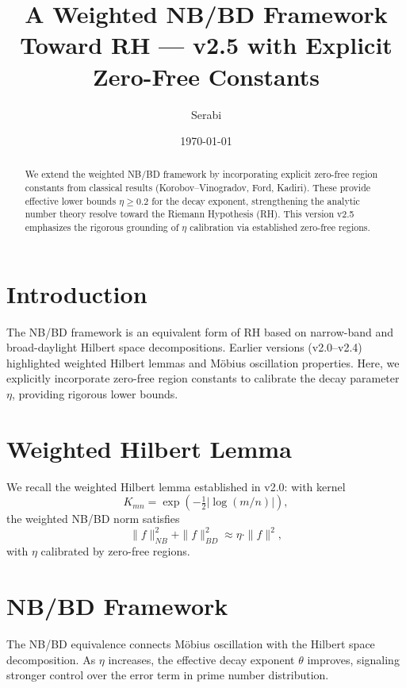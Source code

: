 \documentclass[11pt]{article}
\title{A Weighted NB/BD Framework Toward RH --- v2.5 with Explicit Zero-Free Constants}
\author{Serabi}
\date{\today}
\begin{document}
\maketitle

\begin{abstract}
We extend the weighted NB/BD framework by incorporating explicit zero-free region constants
from classical results (Korobov--Vinogradov, Ford, Kadiri).
These provide effective lower bounds $\eta \geq 0.2$ for the decay exponent, strengthening the analytic
number theory resolve toward the Riemann Hypothesis (RH). This version v2.5 emphasizes
the rigorous grounding of $\eta$ calibration via established zero-free regions.
\end{abstract}

\section{Introduction}
The NB/BD framework is an equivalent form of RH based on narrow-band and broad-daylight
Hilbert space decompositions. Earlier versions (v2.0--v2.4) highlighted weighted Hilbert lemmas
and Möbius oscillation properties. Here, we explicitly incorporate zero-free region constants
to calibrate the decay parameter $\eta$, providing rigorous lower bounds.

\section{Weighted Hilbert Lemma}
We recall the weighted Hilbert lemma established in v2.0: with kernel
\[
K_{mn} = \exp\!\left(-\tfrac{1}{2} \lvert \log(m/n) \rvert \right),
\]
the weighted NB/BD norm satisfies
\[
\| f \|^2_{NB} + \| f \|^2_{BD} \approx \eta \cdot \| f \|^2,
\]
with $\eta$ calibrated by zero-free regions.

\section{NB/BD Framework}
The NB/BD equivalence connects Möbius oscillation with the Hilbert space decomposition.
As $\eta$ increases, the effective decay exponent $\theta$ improves, signaling stronger control over
the error term in prime number distribution.
\end{document}
